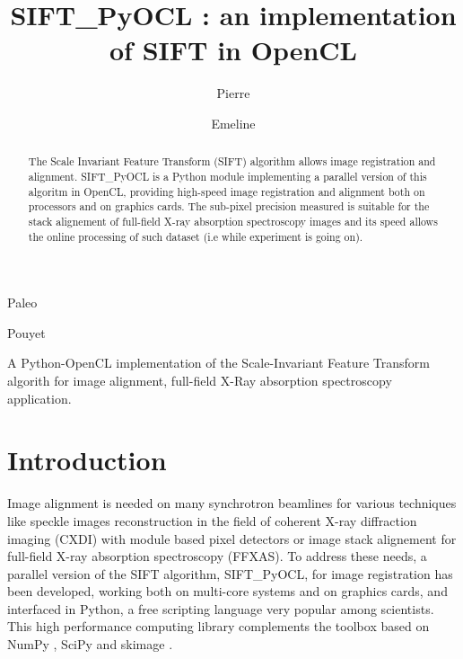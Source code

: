 \documentclass[preprint]{iucr}
\begin{document}
\title{SIFT\_PyOCL : an implementation of SIFT in OpenCL}

    \author[a]{Pierre}{Paleo}
    \author[a]{Emeline}{Pouyet}

\maketitle

\begin{synopsis}
A Python-OpenCL implementation of the  Scale-Invariant Feature Transform
algorith for image alignment, full-field X-Ray absorption
spectroscopy application.
\end{synopsis}

\begin{abstract}
The Scale Invariant Feature Transform (SIFT) algorithm allows image registration
and alignment. 
SIFT\_PyOCL is a Python module implementing a parallel version of this algoritm
in OpenCL,  providing high-speed image registration and alignment both on
processors and on graphics cards. 
The sub-pixel precision measured is suitable for the stack alignement of 
full-field X-ray absorption spectroscopy images and its speed allows the online
processing of such dataset (i.e while experiment is going on).

\end{abstract}

\section{Introduction}

Image alignment is needed on many synchrotron beamlines for
various techniques like speckle images reconstruction in the field of coherent
X-ray diffraction imaging (CXDI) with module based pixel detectors or image
stack alignement for full-field X-ray absorption spectroscopy (FFXAS).
To address these needs, a parallel version of the SIFT algorithm, SIFT\_PyOCL,
for image registration has been developed, working both 
on multi-core systems and on graphics cards, and interfaced in Python, a free
scripting language very popular among scientists. 
This high performance computing library complements
the toolbox based on NumPy \cite{numpy}, SciPy \cite{scipy} and
skimage \cite{skimage}.
\end{document}
